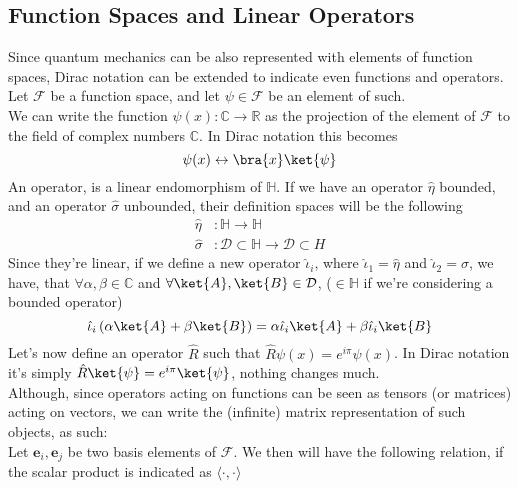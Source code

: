 \documentclass[a4paper, 11pt]{book}
\renewcommand{\vec}[1]{\mathbf{#1}}
\newcommand{\1}{\opr{\mathds{1}}}
\newcommand{\opr}[1]{\hat{#1}}
\theoremstyle{plain}
\begin{document}
	\subsection{Function Spaces and Linear Operators}
	Since quantum mechanics can be also represented with elements of function spaces, Dirac notation can be extended to indicate even functions and operators.\\
	Let $\mathcal{F}$ be a function space, and let $\psi\in\mathcal{F}$ be an element of such.\\
	We can write the function $\psi(x):\mathbb{C}\to\mathbb{R}$ as the projection of the element of $\mathcal{F}$ to the field of complex numbers $\mathbb{C}$. In Dirac notation this becomes
	\begin{equation}
		\psi(x)\leftrightarrow\bra{x}\ket{\psi}
		\label{eq:functionstokets}
	\end{equation}
	An operator, is a linear endomorphism of $\mathbb{H}$. If we have an operator $\opr{\eta}$ bounded, and an operator $\opr{\sigma}$ unbounded, their definition spaces will be the following
	\begin{equation}
		\begin{aligned}
			\opr{\eta}&:\mathbb{H}\to\mathbb{H}\\
			\opr{\sigma}&:\mathcal{D}\subset\mathbb{H}\to\mathcal{D}\subset{H}
		\end{aligned}
		\label{eq:linopdefi}
	\end{equation}
	Since they're linear, if we define a new operator $\opr{\iota}_i$, where $\opr{\iota}_1=\opr{\eta}$ and $\opr{\iota}_2=\sigma$, we have, that $\forall\alpha,\beta\in\mathbb{C}$ and $\forall\ket{A},\ket{B}\in\mathcal{D}$, ($\in\mathbb{H}$ if we're considering a bounded operator)
	\begin{equation}
		\opr{\iota}_i\left( \alpha\ket{A}+\beta\ket{B} \right)=\alpha\opr{\iota}_i\ket{A}+\beta\opr{\iota}_i\ket{B}
		\label{eq:lineardef}
	\end{equation}
	Let's now define an operator $\opr{R}$ such that $\opr{R}\psi(x)=e^{i\pi}\psi(x)$. In Dirac notation it's simply $\opr{R}\ket{\psi}=e^{i\pi}\ket{\psi}$, nothing changes much.\\
	Although, since operators acting on functions can be seen as tensors (or matrices) acting on vectors, we can write the (infinite) matrix representation of such objects, as such:\\
	Let $\vec{e}_i,\vec{e}_j$ be two basis elements of $\mathcal{F}$. We then will have the following relation, if the scalar product is indicated as $\langle\cdot,\cdot\rangle$
\end{document}
